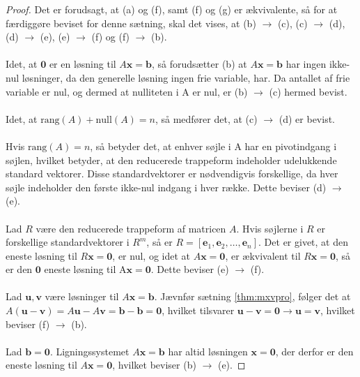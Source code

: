 \begin{proof}
\noindent
Det er forudsagt, at (a) og (f), samt (f) og (g) er ækvivalente, så for at færdiggøre beviset for denne sætning, skal det vises, at (b) $\rightarrow$ (c), (c) $\rightarrow$ (d), (d) $\rightarrow$ (e), (e) $\rightarrow$ (f) og (f) $\rightarrow$ (b).
\\\\
%
Idet, at $\mathbf{0}$ er en løsning til $A\mathbf{x}=\mathbf{b}$, så forudsætter (b) at $A\mathbf{x}=\mathbf{b}$ har ingen ikke-nul løsninger, da den generelle løsning ingen frie variable, har. 
Da antallet af frie variable er nul, og dermed at nulliteten i A er nul, er (b) $\rightarrow$ (c) hermed bevist. 
\\\\
%
Idet, at $\text{rang}(A)+\text{null}(A)=n$, så medfører det, at (c) $\rightarrow$ (d) er bevist.
\\\\
%
Hvis $\text{rang}(A)=n$, så betyder det, at enhver søjle i A har en pivotindgang i søjlen, hvilket betyder, at den reducerede trappeform indeholder udelukkende standard vektorer. 
Disse standardvektorer er nødvendigvis forskellige, da hver søjle indeholder den første ikke-nul indgang i hver række. 
Dette beviser (d) $\rightarrow$ (e).
%
\\\\
Lad $R$ være den reducerede trappeform af matricen $A$. Hvis søjlerne i $R$ er forskellige standardvektorer i $R^m$, så er $R= [ \mathbf{e}_1, \mathbf{e}_2, \ldots, \mathbf{e}_n]$. 
Det er givet, at den eneste løsning til $R\mathbf{x}=\mathbf{0}$, er nul, og idet at $A\mathbf{x}=\mathbf{0}$, er ækvivalent til $R\mathbf{x}=\mathbf{0}$, så er den $\mathbf{0}$ eneste løsning til A$\mathbf{x}=\mathbf{0}$. 
Dette beviser (e) $\rightarrow$ (f).
\\\\
%
Lad $\mathbf{u}, \mathbf{v}$ være løsninger til $A\mathbf{x}=\mathbf{b}$.
Jævnfør sætning \ref{thm:mxvpro}, følger det at $A(\mathbf{u}-\mathbf{v})=A\mathbf{u}-A\mathbf{v}=\mathbf{b}-\mathbf{b}=\mathbf{0}$, hvilket tilsvarer $\mathbf{u}-\mathbf{v}=\mathbf{0}
\rightarrow  
\mathbf{u} =\mathbf{v}$, hvilket beviser (f) $\rightarrow$ (b).
\\\\
%
Lad $\mathbf{b}=\mathbf{0}$. 
Ligningssystemet $A\mathbf{x}=\mathbf{b}$ har altid løsningen $\mathbf{x}=\mathbf{0}$, der derfor er den eneste løsning til $A\mathbf{x}=\mathbf{0}$, hvilket beviser (b) $\rightarrow$ (e).
%
\end{proof}
